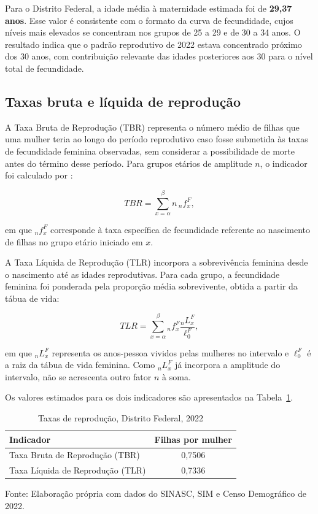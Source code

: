 \documentclass[a4paper,12pt]{article}
\newcommand{\fonte}[1]{\par\noindent\footnotesize Fonte: #1}
\begin{document}
Para o Distrito Federal, a idade média à maternidade estimada foi de \textbf{29,37 anos}. Esse valor é consistente com o formato da curva de fecundidade, cujos níveis mais elevados se concentram nos grupos de 25 a 29 e de 30 a 34 anos. O resultado indica que o padrão reprodutivo de 2022 estava concentrado próximo dos 30 anos, com contribuição relevante das idades posteriores aos 30 para o nível total de fecundidade.

\subsection{Taxas bruta e líquida de reprodução}

A Taxa Bruta de Reprodução (TBR) representa o número médio de filhas que uma mulher teria ao longo do período reprodutivo caso fosse submetida às taxas de fecundidade feminina observadas, sem considerar a possibilidade de morte antes do término desse período. Para grupos etários de amplitude \(n\), o indicador foi calculado por \cite{grupofoz2021,preston2001}:

\begin{equation}
TBR = \sum_{x=\alpha}^{\beta} n\,{}_nf_x^F,
\end{equation}

\noindent em que \({}_nf_x^F\) corresponde à taxa específica de fecundidade referente ao nascimento de filhas no grupo etário iniciado em \(x\).

A Taxa Líquida de Reprodução (TLR) incorpora a sobrevivência feminina desde o nascimento até as idades reprodutivas. Para cada grupo, a fecundidade feminina foi ponderada pela proporção média sobrevivente, obtida a partir da tábua de vida:

\begin{equation}
TLR =
\sum_{x=\alpha}^{\beta}{}_nf_x^F
\frac{{}_nL_x^F}{\ell_0^F},
\end{equation}

\noindent em que \({}_nL_x^F\) representa os anos-pessoa vividos pelas mulheres no intervalo e \(\ell_0^F\) é a raiz da tábua de vida feminina. Como \({}_nL_x^F\) já incorpora a amplitude do intervalo, não se acrescenta outro fator \(n\) à soma.

Os valores estimados para os dois indicadores são apresentados na Tabela~\ref{tab:tbr_tlr}.

\begin{table}[H]
    \centering
    \caption{Taxas de reprodução, Distrito Federal, 2022}
    \label{tab:tbr_tlr}
    \begin{tabular}{lc}
        \toprule
        Indicador & Filhas por mulher \\
        \midrule
        Taxa Bruta de Reprodução (TBR)   & 0,7506 \\
        Taxa Líquida de Reprodução (TLR) & 0,7336 \\
        \bottomrule
    \end{tabular}
    
    \vspace{0.2cm}
    \fonte{Elaboração própria com dados do SINASC, SIM e Censo Demográfico de 2022.}
\end{table}
\end{document}
